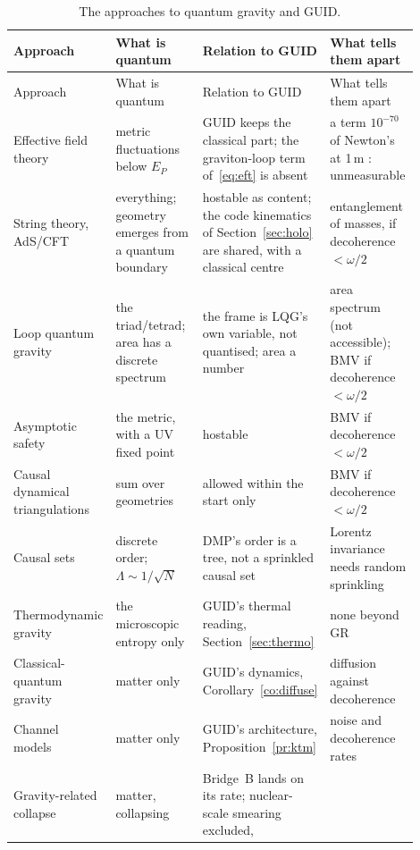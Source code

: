 \begin{center}\small
\begin{longtable}{@{}P{0.18\linewidth}P{0.22\linewidth}P{0.28\linewidth}P{0.22\linewidth}@{}}
\caption{The approaches to quantum gravity and GUID.}\label{tab:landscape}\\
\toprule
Approach & What is quantum & Relation to GUID & What tells them apart \\
\midrule
\endfirsthead
\toprule
Approach & What is quantum & Relation to GUID & What tells them apart \\
\midrule
\endhead
Effective field theory~\cite{donoghue,bdh} & metric fluctuations below $E_P$ & GUID keeps the classical part; the graviton-loop term
of~\eqref{eq:eft} is absent & a term $10^{-70}$ of Newton's at 1\,m : unmeasurable \\
String theory, AdS/CFT~\cite{maldacena} & everything; geometry emerges from a quantum boundary & hostable as content; the code kinematics
of Section~\ref{sec:holo} are shared, with a classical centre & entanglement of masses, if decoherence $<\omega/2$ \\
Loop quantum gravity~\cite{ashtekar,rovellismolin} & the triad/tetrad; area has a discrete spectrum & the frame is LQG's own variable, not
quantised; area a number & area spectrum (not accessible); BMV if decoherence $<\omega/2$ \\
Asymptotic safety~\cite{weinberg79,reuter} & the metric, with a UV fixed point & hostable & BMV if decoherence $<\omega/2$ \\
Causal dynamical triangulations~\cite{cdt} & sum over geometries & allowed within the start only & BMV if decoherence $<\omega/2$ \\
Causal sets~\cite{bombelli} & discrete order; $\Lambda\sim1/\sqrt N$ & DMP's order is a tree, not a sprinkled causal set & Lorentz
invariance needs random sprinkling \\
Thermodynamic gravity~\cite{jacobson95} & the microscopic entropy only & GUID's thermal reading, Section~\ref{sec:thermo} & none
beyond GR \\
Classical-quantum gravity~\cite{oppenheim,osswd} & matter only & GUID's dynamics, Corollary~\ref{co:diffuse} & diffusion against
decoherence \\
Channel models~\cite{ktm,tilloydiosi} & matter only & GUID's architecture, Proposition~\ref{pr:ktm} & noise and decoherence rates \\
Gravity-related collapse~\cite{diosi87,penrose96} & matter, collapsing & Bridge~B lands on its rate; nuclear-scale smearing excluded,

\end{longtable}
\end{center}
